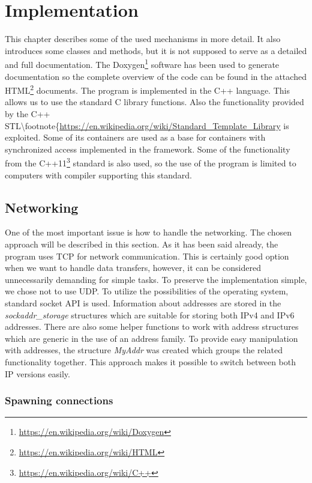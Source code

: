 \chapter{Implementation}\label{implementation}

This chapter describes some of the used mechanisms in more detail. It
also introduces some classes and methods, but it is not supposed to
serve as a detailed and full documentation. The
Doxygen\footnote{\url{https://en.wikipedia.org/wiki/Doxygen}} software
has been used to generate documentation so the complete overview of the
code can be found in the attached
HTML\footnote{\url{https://en.wikipedia.org/wiki/HTML}} documents. The
program is implemented in the C++ language. This allows us to use the
standard C library functions. Also the functionality provided by the C++
STL\textbackslash{}footnote\{\url{https://en.wikipedia.org/wiki/Standard\_Template\_Library}
is exploited. Some of its containers are used as a base for containers
with synchronized access implemented in the framework. Some of the
functionality from the
C++11\footnote{\url{https://en.wikipedia.org/wiki/C++}} standard is also
used, so the use of the program is limited to computers with compiler
supporting this standard.

\section{Networking}\label{networking}

One of the most important issue is how to handle the networking. The
chosen approach will be described in this section. As it has been said
already, the program uses TCP for network communication. This is
certainly good option when we want to handle data transfers, however, it
can be considered unnecessarily demanding for simple tasks. To preserve
the implementation simple, we chose not to use UDP. To utilize the
possibilities of the operating system, standard socket API is used.
Information about addresses are stored in the \textit{sockaddr\_storage}
structures which are suitable for storing both IPv4 and IPv6 addresses.
There are also some helper functions to work with address structures
which are generic in the use of an address family. To provide easy
manipulation with addresses, the structure \textit{MyAddr} was created
which groups the related functionality together. This approach makes it
possible to switch between both IP versions easily.

\subsection{Spawning connections}\label{spawning-connections}

